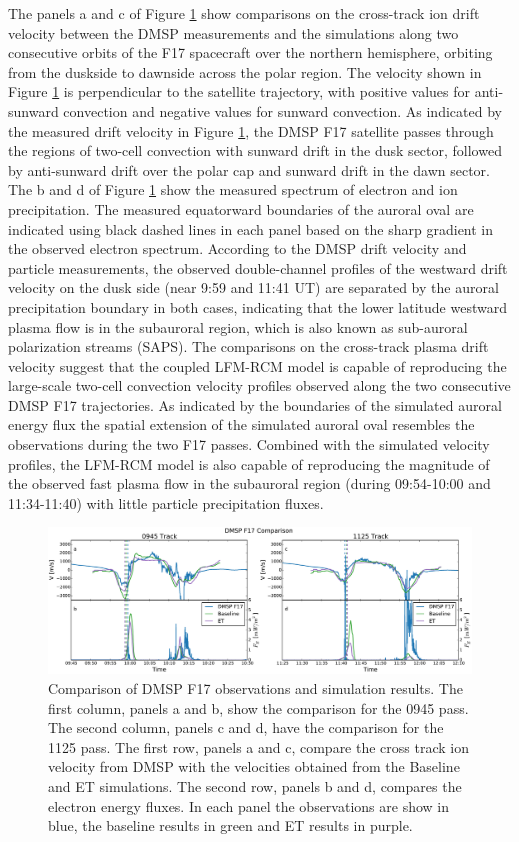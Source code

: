 \documentclass[draft,jgrga]{agutex}
\begin{document}
\begin{article}
The panels a and c of Figure \ref{f17-comp-fig} show comparisons on the cross-track ion drift velocity between the DMSP measurements and the simulations along two consecutive orbits of the F17 spacecraft over the northern hemisphere, orbiting from the duskside to dawnside across the polar region. The velocity shown in Figure \ref{f17-comp-fig} is perpendicular to the satellite trajectory, with positive values for anti-sunward convection and negative values for sunward convection. As indicated by the measured drift velocity in Figure \ref{f17-comp-fig}, the DMSP F17 satellite passes through the regions of two-cell convection with sunward drift in the dusk sector, followed by anti-sunward drift over the polar cap and sunward drift in the dawn sector. The b and d of Figure \ref{f17-comp-fig} show the measured spectrum of electron and ion precipitation. The measured equatorward boundaries of the auroral oval are indicated using black dashed lines in each panel based on the sharp gradient in the observed electron spectrum. According to the DMSP drift velocity and particle measurements, the observed double-channel profiles of the westward drift velocity on the dusk side (near 9:59 and 11:41 UT) are separated by the auroral precipitation boundary in both cases, indicating that the lower latitude westward plasma flow is in the subauroral region, which is also known as sub-auroral polarization streams (SAPS). The comparisons on the cross-track plasma drift velocity suggest that the coupled LFM-RCM model is capable of reproducing the large-scale two-cell convection velocity profiles observed along the two consecutive DMSP F17 trajectories. As indicated by the boundaries of the simulated auroral energy flux  the spatial extension of the simulated auroral oval resembles the observations during the two F17 passes. Combined with the simulated velocity profiles, the LFM-RCM model is also capable of reproducing the magnitude of the observed fast plasma flow in the subauroral region (during 09:54-10:00 and 11:34-11:40) with little particle precipitation fluxes.
 
\begin{figure}[t]
\noindent\includegraphics[width=39pc]{JGR-DMSPF17.pdf}
\caption{\label{f17-comp-fig}
Comparison of DMSP F17 observations and simulation results.  The first column, panels a and b, show the comparison for the 0945 pass.  The second column, panels c and d, have the comparison for the 1125 pass.  The first row, panels a and c, compare the cross track ion velocity from DMSP with the velocities obtained from the Baseline and ET simulations.  The second row, panels b and d, compares the electron energy fluxes.  In each panel the observations are show in blue, the baseline results in green and ET results in purple.}
\end{figure}


\end{article}
\end{document}
